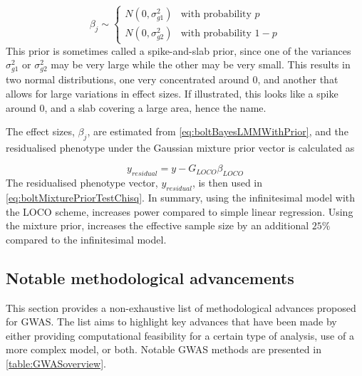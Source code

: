 \begin{equation}
\beta_j \sim
\begin{cases}
N(0, \sigma^2_{g1}) & \text{with probability } p \\
N(0, \sigma^2_{g2}) & \text{with probability } 1-p
\end{cases}
\end{equation}
This prior is sometimes called a spike-and-slab prior, since one of the variances $ \sigma^2_{g1} $ or $  \sigma^2_{g2} $ may be very large while the other may be very small. This results in two normal distributions, one very concentrated around $ 0 $, and another that allows for large variations in effect sizes. If illustrated, this looks like a spike around $ 0 $, and a slab covering a large area, hence the name.

The effect sizes, $ \beta_j $, are estimated from \cref{eq:boltBayesLMMWithPrior}, and the residualised phenotype under the Gaussian mixture prior vector is calculated as

\begin{equation}
y_{residual} = y - G_{LOCO}\beta_{LOCO}
\end{equation}
The residualised phenotype vector, $ y_{residual} $, is then used in \cref{eq:boltMixturePriorTestChisq}. In summary, using the infinitesimal model with the LOCO scheme, increases power compared to simple linear regression. Using the mixture prior, increases the effective sample size by an additional $ 25\% $ compared to the infinitesimal model.



\subsection{Notable methodological advancements}
This section provides a non-exhaustive list of methodological advances proposed for GWAS. The list aims to highlight key advances that have been made by either providing computational feasibility for a certain type of analysis, use of a more complex model, or both. Notable GWAS methods are presented in \cref{table:GWASoverview}. 

